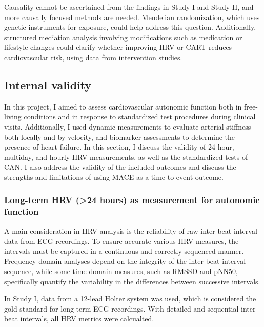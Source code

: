 \documentclass[
  a4paper,
  headsepline=true,
  open=any]{scrbook}
\begin{document}
Causality cannot be ascertained from the findings in Study I and Study
II, and more causally focused methods are needed. Mendelian
randomization, which uses genetic instruments for exposure, could help
address this question. Additionally, structured mediation analysis
involving modifications such as medication or lifestyle changes could
clarify whether improving HRV or CART reduces cardiovascular risk, using
data from intervention studies.

\hypertarget{internal-validity}{%
\subsection{Internal validity}\label{internal-validity}}

In this project, I aimed to assess cardiovascular autonomic function
both in free-living conditions and in response to standardized test
procedures during clinical visits. Additionally, I used dynamic
measurements to evaluate arterial stiffness both locally and by
velocity, and biomarker assessments to determine the presence of heart
failure. In this section, I discuss the validity of 24-hour, multiday,
and hourly HRV measurements, as well as the standardized tests of CAN. I
also address the validity of the included outcomes and discuss the
strengths and limitations of using MACE as a time-to-event outcome.

\hypertarget{long-term-hrv-24-hours-as-measurement-for-autonomic-function}{%
\subsubsection{Long-term HRV (\textgreater24 hours) as measurement for
autonomic
function}\label{long-term-hrv-24-hours-as-measurement-for-autonomic-function}}

A main consideration in HRV analysis is the reliability of raw
inter-beat interval data from ECG recordings. To ensure accurate various
HRV measures, the intervals must be captured in a continuous and
correctly sequenced manner. Frequency-domain analyses depend on the
integrity of the inter-beat interval sequence, while some time-domain
measures, such as RMSSD and pNN50, specifically quantify the variability
in the differences between successive intervals.

In Study I, data from a 12-lead Holter system was used, which is
considered the gold standard for long-term ECG recordings. With detailed
and sequential inter-beat intervals, all HRV metrics were calcualted.
\end{document}
